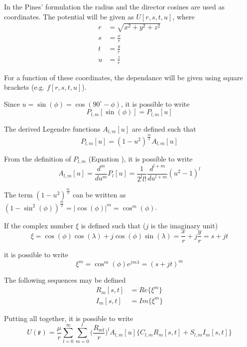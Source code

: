 \documentclass[]{AVSSimReportMemo}
\begin{document}
In the Pines' formulation the radius and the director cosines are used as coordinates. The potential will be given as $U[r, s, t, u]$, where
\begin{align}
r &= \sqrt{x^2+y^2+z^2}\\
s &= \frac{x}{r}\\
t &= \frac{y}{r}\\
u &= \frac{z}{r}
\end{align}

For a function of these coordinates, the dependance will be given using square brackets (e.g. $f[r,s,t,u]$).

Since $u = \sin(\phi) = \cos(90^\circ - \phi)$, it is possible to write
\begin{equation}
P_{l,m}[\sin(\phi)] = P_{l,m}[u]
\end{equation}

The derived Legendre functions $A_{l,m}[u]$ are defined such that
\begin{equation}
P_{l,m}[u] = (1 - u^2)^\frac{m}{2} A_{l,m}[u]
\end{equation}

From the definition of $P_{l,m}$ (Equation ), it is possible to write
\begin{equation}
A_{l,m}[u] = \frac{d^m}{d u^m} P_l[u] = \frac{1}{2^l l!} \frac{d^{l+m}}{d u^{l+m}} (u^2 - 1)^l\label{eq:der_leg}
\end{equation}

The term $(1 - u^2)^\frac{m}{2}$ can be written as $(1 - \sin^2(\phi))^\frac{m}{2} = |\cos(\phi)|^m = \cos^m(\phi)$.

If the complex number $\xi$ is defined such that ($j$ is the imaginary unit)
\begin{equation}
\xi = \cos(\phi) \cos(\lambda) + j \cos(\phi) \sin(\lambda) = \frac{x}{r} + j \frac{y}{r} = s + j t
\end{equation}

it is possible to write
\begin{equation}
\xi^m = \cos^m(\phi) e^{j m \lambda} = (s + j t)^m
\end{equation}

The following sequences may be defined
\begin{align}
R_m[s,t] &= Re\{\xi^m\}\\
I_m[s,t] &= Im\{\xi^m\}
\end{align}

Putting all together, it is possible to write
\begin{equation}
U(\mathbf{\bar r}) = \frac{\mu}{r} \sum_{l=0}^\infty \sum_{m=0}^l \bigg(\frac{R_{\text{ref}}}{r}\bigg)^l A_{l,m}[u] \{C_{l,m} R_m[s,t] + S_{l,m} I_m[s,t]\}
\end{equation}
\end{document}
